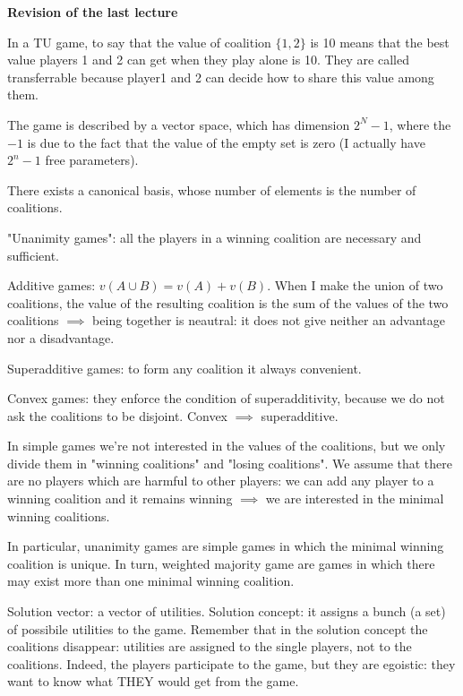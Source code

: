 \documentclass[pt11,a4paper,twoside,reqno,openright]{paper}
\begin{document}

\bigskip
\noindent \textbf{Revision of the last lecture}

\noindent In a TU game, to say that the value of coalition $\{1,2\}$ is 10 
means that the best value players 1 and 2 can get when they play alone is 10. 
They are called transferrable because player1 and 2 can decide how to share 
this value among them.

\noindent The game is described by a vector space, which has dimension $2^N-1$, 
where the $-1$ is due to the fact that the value of the empty set is zero (I 
actually have $2^n-1$ free parameters).

\noindent There exists a canonical basis, whose number of elements is the 
number of coalitions.

\noindent "Unanimity games": all the players in a winning coalition are 
necessary and sufficient.

\noindent Additive games: $v(A \cup B) = v(A)+v(B)$. When I make the union of 
two coalitions, the value of the resulting coalition is the sum of the values 
of the two coalitions $\implies$ being together is neautral: it does not give 
neither an advantage nor a disadvantage.

\noindent Superadditive games: to form any coalition it always convenient.  

\noindent Convex games: they enforce the condition of superadditivity, because 
we do not ask the coalitions to be disjoint. Convex $\implies$ superadditive.

\noindent In simple games we're not interested in the values of the coalitions, 
but we only divide them in "winning coalitions" and "losing coalitions". We 
assume that there are no players which are harmful to other players: we can add 
any player to a winning coalition and it remains winning $\implies$ we are 
interested in the minimal winning coalitions.

\noindent In particular, unanimity games are simple games in which the minimal 
winning coalition is unique. In turn, weighted majority game are games in which 
there may exist more than one minimal winning coalition.

\noindent Solution vector: a vector of utilities. Solution concept: it assigns 
a bunch (a set) of possibile utilities to the game. Remember that in the 
solution concept the coalitions disappear: utilities are assigned to the single 
players, not to the coalitions. Indeed, the players participate to the game, 
but they are egoistic: they want to know what THEY would get from the game.
\end{document}
